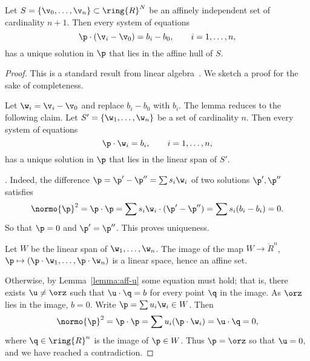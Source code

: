 \begin{lemma}\label{lemma:affine-system} 
  Let $S=\{\v_0,\ldots,\v_n\}\subset \ring{R}^N$ be an affinely
  independent set of cardinality $n+1$.  Then every system of
  equations
\begin{displaymath} 
\p \cdot (\v_i - \v_0) = b_i-b_0,\qquad i=1,\ldots,n,
\end{displaymath}
has a unique solution in $\p$ that lies in the affine hull of $S$.
\end{lemma}

\begin{proof} This is a standard result from linear algebra~\cite{XX}.
We sketch a proof for the sake of completeness.  

Let $\w_i = \v_i-\v_0$ and replace $b_i-b_0$ with $b_i$.  
The lemma reduces to the following claim.
Let $S' = \{\w_1,\ldots,\w_n\}$ be a  set
of cardinality $n$.  Then every system of equations
\begin{displaymath} 
\p \cdot \w_i = b_i,\qquad i=1,\ldots,n,
\end{displaymath}
has a unique solution in $\p$ that lies in the linear span of $S'$.

. Indeed, the difference 
$\p = \p'-\p'' = \sum s_i \w_i$ of two solutions
$\p',\p''$ satisfies
\begin{displaymath} 
\normo{\p}^2=\p\cdot\p = \sum s_i \w_i \cdot (\p' - \p'') =
\sum s_i (b_i-b_i)= 0.
\end{displaymath}
So that $\p=0$ and $\p'=\p''$.  This proves uniqueness.

Let $W$ be the linear span of $\w_1,\ldots,\w_n$.  The image of the
map $W\to\ring{R}^n$, $\p\mapsto (\p\cdot\w_1,\ldots,\p\cdot\w_n)$ is
a linear space, hence an affine set.

Otherwise, by Lemma~\ref{lemma:aff-u} some equation must hold; that
is, there exists $\u\ne \orz$ such that $\u\cdot \q =b$ for every
point $\q$ in the image.  As $\orz$ lies in the image, $b=0$.  Write
$\p = \sum u_i \w_i\in W$.  Then
\begin{displaymath} 
\normo{\p}^2 = \p\cdot\p = \sum u_i (\p \cdot \w_i) = \u\cdot \q = 0,
\end{displaymath} 
where $\q\in\ring{R}^n$ is the image of $\p\in W$.
Thus $\p=\orz$ so that $\u=0$, and we have reached a contradiction.
\end{proof}

